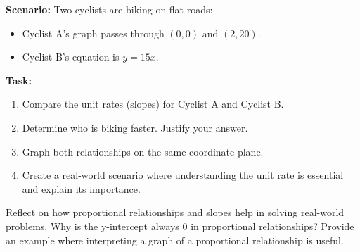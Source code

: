 \documentclass[12pt]{article}
\begin{document}
\vspace{1em}

\begin{tcolorbox}[colframe=black!60, colback=white, 
coltitle=black, colbacktitle=black!15, fonttitle=\bfseries\Large, 
title=Performance Task: Comparing Travel Speeds, halign title=center, left=10pt, right=10pt, top=10pt, bottom=50pt]
\textbf{Scenario:} Two cyclists are biking on flat roads:
\begin{itemize}
    \item Cyclist A's graph passes through \((0, 0)\) and \((2, 20)\).
    \item Cyclist B's equation is \(y = 15x\).
\end{itemize}
\textbf{Task:}
\begin{enumerate}[itemsep=3em]
    \item Compare the unit rates (slopes) for Cyclist A and Cyclist B.
    \item Determine who is biking faster. Justify your answer.
    \item Graph both relationships on the same coordinate plane.
    \item Create a real-world scenario where understanding the unit rate is essential and explain its importance.
\end{enumerate}
\end{tcolorbox}

\vspace{1em}

\begin{tcolorbox}[colframe=black!60, colback=white, 
coltitle=black, colbacktitle=black!15, fonttitle=\bfseries\Large, 
title=Reflection, halign title=center, left=10pt, right=10pt, top=10pt, bottom=80pt]
Reflect on how proportional relationships and slopes help in solving real-world problems. Why is the y-intercept always \(0\) in proportional relationships? Provide an example where interpreting a graph of a proportional relationship is useful.
\end{tcolorbox}
\end{document}

